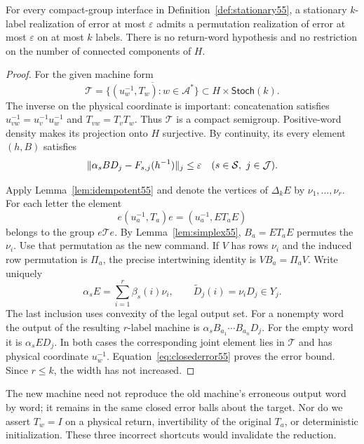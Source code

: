 \begin{theorem}\label{thm:purification55}
For every compact-group interface in Definition~\ref{def:stationary55}, a stationary $k$-label realization of error at most $\varepsilon$ admits a permutation realization of error at most $\varepsilon$ on at most $k$ labels. There is no return-word hypothesis and no restriction on the number of connected components of $H$.
\end{theorem}
\begin{proof}
For the given machine form
\[
 \mathcal T=\overline{\{(u_w^{-1},T_w):w\in\mathcal A^*\}}
       \subset H\times\mathsf{Stoch}(k).
\]
The inverse on the physical coordinate is important: concatenation satisfies $u_{vw}^{-1}=u_v^{-1}u_w^{-1}$ and $T_{vw}=T_vT_w$. Thus $\mathcal T$ is a compact semigroup. Positive-word density makes its projection onto $H$ surjective. By continuity, its every element $(h,B)$ satisfies
\begin{equation}\label{eq:closederror55}
             \lVert \alpha_sBD_j-F_{s,j}(h^{-1})\rVert_j\le\varepsilon
             \quad(s\in\mathcal S,\ j\in\mathcal J).
\end{equation}

Apply Lemma~\ref{lem:idempotent55} and denote the vertices of $\Delta_k E$ by $\nu_1,\ldots,\nu_r$. For each letter the element
\[
        e(u_a^{-1},T_a)e=(u_a^{-1},ET_aE)
\]
belongs to the group $e\mathcal T e$. By Lemma~\ref{lem:simplex55}, $B_a=ET_aE$ permutes the $\nu_i$. Use that permutation as the new command. If $V$ has rows $\nu_i$ and the induced row permutation is $\Pi_a$, the precise intertwining identity is $VB_a=\Pi_aV$. Write uniquely
\[
          \alpha_sE=\sum_{i=1}^r\beta_s(i)\nu_i,
          \qquad \widetilde D_j(i)=\nu_iD_j\in Y_j.
\]
The last inclusion uses convexity of the legal output set. For a nonempty word the output of the resulting $r$-label machine is $\alpha_s B_{a_1}\cdots B_{a_n}D_j$. For the empty word it is $\alpha_sED_j$. In both cases the corresponding joint element lies in $\mathcal T$ and has physical coordinate $u_w^{-1}$. Equation~\eqref{eq:closederror55} proves the error bound. Since $r\le k$, the width has not increased.
\end{proof}
The new machine need not reproduce the old machine's erroneous output word by word; it remains in the same closed error balls about the target. Nor do we assert $T_{w}=I$ on a physical return, invertibility of the original $T_a$, or deterministic initialization. These three incorrect shortcuts would invalidate the reduction.

